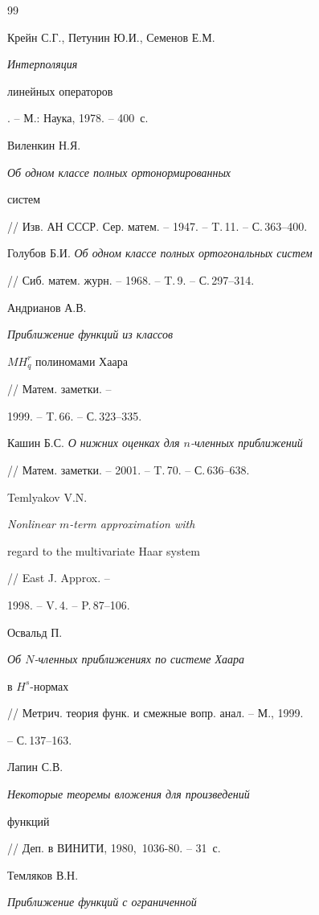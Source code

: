 \begin{thebibliography}{99}







Крейн С.Г., Петунин Ю.И., Семенов Е.М. {\em Интерполяция 


линейных операторов}. -- М.: Наука, 1978. -- 400~с.




Виленкин Н.Я. {\em Об одном классе полных ортонормированных 


систем} // Изв. АН СССР. Сер. матем. -- 1947. -- T.\,11. -- С.\,363--400.




Голубов Б.И. {\em Об одном классе полных ортогональных систем} 


// Сиб. матем. журн. -- 1968. -- T.\,9. -- С.\,297--314.




Андрианов А.В. {\em Приближение функций из классов 


$MH_{q}^{r}$ полиномами Хаара} // Матем. заметки. --


1999. -- T.\,66. -- С.\,323--335.




Кашин Б.С. {\em О нижних оценках для $n$-членных приближений} 


// Матем. заметки. -- 2001. -- T.\,70. -- С.\,636--638. 




Temlyakov V.N. {\em Nonlinear $m$-term approximation with 


regard to the multivariate Haar system} // East J. Approx. --


1998. -- V.\,4. -- P.\,87--106.




Освальд П. {\em Об $N$-членных приближениях по системе Хаара 


в $H^{s}$-нормах} // Метрич. теория функ. и смежные вопр. анал. -- М., 1999. 


-- С.\,137--163.




Лапин С.В. {\em Некоторые теоремы вложения для произведений 


функций} // Деп. в ВИНИТИ, 1980, \No\,1036-80. -- 31~с.




Темляков В.Н. {\em Приближение функций с ограниченной 


}
\end{thebibliography}
